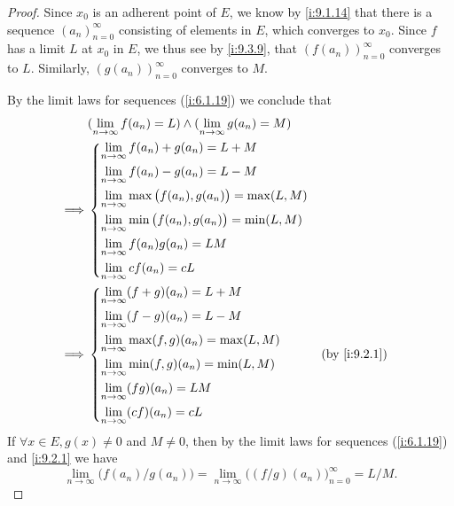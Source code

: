 \begin{proof}
  Since \(x_0\) is an adherent point of \(E\), we know by \cref{i:9.1.14} that there is a sequence \((a_n)_{n = 0}^\infty\) consisting of elements in \(E\), which converges to \(x_0\).
  Since \(f\) has a limit \(L\) at \(x_0\) in \(E\), we thus see by \cref{i:9.3.9}, that \((f(a_n))_{n = 0}^\infty\) converges to \(L\).
  Similarly, \((g(a_n))_{n = 0}^\infty\) converges to \(M\).

  By the limit laws for sequences (\cref{i:6.1.19}) we conclude that
  \begin{align*}
             & (\lim_{n \to \infty} f(a_n) = L) \land (\lim_{n \to \infty} g(a_n) = M) \\
    \implies & \begin{dcases}
                 \lim_{n \to \infty} f(a_n) + g(a_n) = L + M                   \\
                 \lim_{n \to \infty} f(a_n) - g(a_n) = L - M                   \\
                 \lim_{n \to \infty} \max\big(f(a_n), g(a_n)\big) = \max(L, M) \\
                 \lim_{n \to \infty} \min\big(f(a_n), g(a_n)\big) = \min(L, M) \\
                 \lim_{n \to \infty} f(a_n) g(a_n) = LM                        \\
                 \lim_{n \to \infty} cf(a_n) = cL
               \end{dcases}           \\
    \implies & \begin{dcases}
                 \lim_{n \to \infty} (f + g)(a_n) = L + M         \\
                 \lim_{n \to \infty} (f - g)(a_n) = L - M         \\
                 \lim_{n \to \infty} \max(f, g)(a_n) = \max(L, M) \\
                 \lim_{n \to \infty} \min(f, g)(a_n) = \min(L, M) \\
                 \lim_{n \to \infty} (fg)(a_n) = LM               \\
                 \lim_{n \to \infty} (cf)(a_n) = cL
               \end{dcases}                     &  & \by{i:9.2.1}
  \end{align*}
  If \(\forall x \in E, g(x) \neq 0\) and \(M \neq 0\), then by the limit laws for sequences (\cref{i:6.1.19}) and \cref{i:9.2.1} we have
  \[
    \lim_{n \to \infty} \big(f(a_n) / g(a_n)\big) = \lim_{n \to \infty} \big((f / g)(a_n)\big)_{n = 0}^\infty = L / M.
\]
\end{proof}
